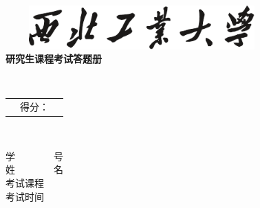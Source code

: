 \begin{titlepage}
	\sSihao ~ \\
	\sSihao ~ \\
	\sSihao ~ \\
	
	\begin{center}
		\includegraphics[width=10.48cm,height=1.69cm]{pic/university_text_logo}\\
		\vspace{9pt}
		\sXiaoyi \fSong \bfseries{研究生课程考试答题册}
	\end{center}
	
	\sSihao ~ \\
	
	
	
	
	\begin{table}[h]
		\begin{tabular}[c]{m{8cm}|m{4.32cm}|c}
			\cline{2-2}
			& \vspace{.8cm} \sSihao \fKai 得分： \vspace{.8cm} & \\
			\cline{2-2}
			
		\end{tabular}
	\end{table}
	
	\sSihao ~\\
	
	\begin{center}
		{
			\fKai \sSihao 学~~~~~~~~号 \coverunderline[8cm]{}\\
			\fKai \sSihao 姓~~~~~~~~名 \coverunderline[8cm]{}\\
			\fKai \sSihao 考试课程 \\
			\fKai \sSihao 考试时间 
		}
	\end{center}
\end{titlepage}